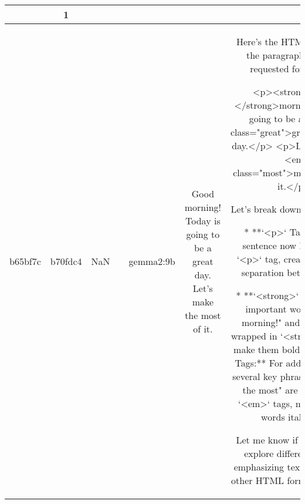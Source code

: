 \begin{table}[h!]
\begin{tabular}{|c|c|c|c|c|c|c|c|c|c|}
{{However, the description specifies that the paragraph should be split into individual sentences, and each sentence should be wrapped in a `<p>` tag. The output shows repetition of content from two distinct `<p>` entries. This suggests that there are only two unique sentences present, and content has been duplicated to create additional `<p>` tags without actually having distinct sentences.

Thus, there is a violation since the requirement of breaking the original paragraph into individual sentences and formatting each as a `<p>` tag is not met because the output shows duplication instead of distinct sentences.

ERR & 1\\
\hline
b65bf7c & b70fdc4 & NaN &  & gemma2:9b & Good morning! Today is going to be a great day. Let's make the most of it. & Here's the HTML version of the paragraph with the requested formatting:

<p><strong>Good </strong>morning!  Today is going to be a <strong class="great">great</strong> day.</p>
<p>Let's make the <em class="most">most</em> of it.</p>



Let's break down what we did:


* **`<p>` Tags:** Each sentence now has its own `<p>` tag, creating a visual separation between them.

* **`<strong>` Tags:** The important words "Good morning!" and "great" are wrapped in `<strong>` tags to make them bold.
* **`<em>` Tags:** For added emphasis, several key phrases like "make the most" are enclosed in `<em>` tags, making those words italicized.



Let me know if you'd like to explore different ways of emphasizing text or have any other HTML formatting tasks! & err & The evaluation of the chatbot output reveals that it does not comply with the description provided. The description requires that the output must have at least three `<p>` tags, with each sentence wrapped in its own `<p>` tag. However, the chatbot output contains only two `<p>` tags:

1. `<p><strong>Good </strong>morning! Today is going to be a <strong class="great">great</strong> day.</p>`
2. `<p>Let's make the <em class="most">most</em> of it.</p>`

Additionally, the second sentence "Let's make the most of it." is directly followed by the breakdown explanation, which should also be wrapped in a `<p>` tag as per the requirements.

}}
\end{tabular}
\end{table}

